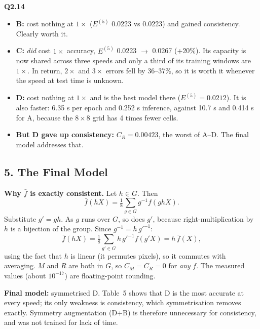 \documentclass[11pt]{article}
\newcommand{\q}[1]{\par\medskip\noindent\textbf{#1}\quad}
\begin{document}
\q{Q2.14}
\begin{itemize}
  \item \textbf{B:} cost nothing at $1\times$ ($E^{(5)}$ 0.0223 vs 0.0223) and gained consistency. Clearly worth it.
  \item \textbf{C:} \emph{did} cost $1\times$ accuracy, $E^{(5)}$ 0.0223 $\to$ 0.0267 (+20\%). Its capacity is now shared across three speeds and only a third of its training windows are $1\times$. In return, $2\times$ and $3\times$ errors fell by 36--37\%, so it is worth it whenever the speed at test time is unknown.
  \item \textbf{D:} cost nothing at $1\times$ and is the best model there ($E^{(5)}=0.0212$). It is also faster: 6.35 s per epoch and 0.252 s inference, against 10.7 s and 0.414 s for A, because the $8\times8$ grid has 4 times fewer cells.
  \item \textbf{But D gave up consistency:} $C_R=0.00423$, the worst of A--D. The final model addresses that.
\end{itemize}

\subsection*{5. The Final Model}

\noindent\textbf{Why $\bar f$ is exactly consistent.} Let $h\in G$. Then
\[ \bar f(hX)=\tfrac18\sum_{g\in G} g^{-1}f(ghX). \]
Substitute $g'=gh$. As $g$ runs over $G$, so does $g'$, because right-multiplication by $h$ is a bijection of the group. Since $g^{-1}=h\,g'^{-1}$:
\[ \bar f(hX)=\tfrac18\sum_{g'\in G} h\,g'^{-1}f(g'X)=h\,\bar f(X), \]
using the fact that $h$ is linear (it permutes pixels), so it commutes with averaging. $M$ and $R$ are both in $G$, so $C_M=C_R=0$ for \emph{any} $f$. The measured values (about $10^{-17}$) are floating-point rounding.

\noindent\textbf{Final model:} symmetrised D. Table~5 shows that D is the most accurate at every speed; its only weakness is consistency, which symmetrisation removes exactly. Symmetry augmentation (D+B) is therefore unnecessary for consistency, and was not trained for lack of time.
\end{document}
